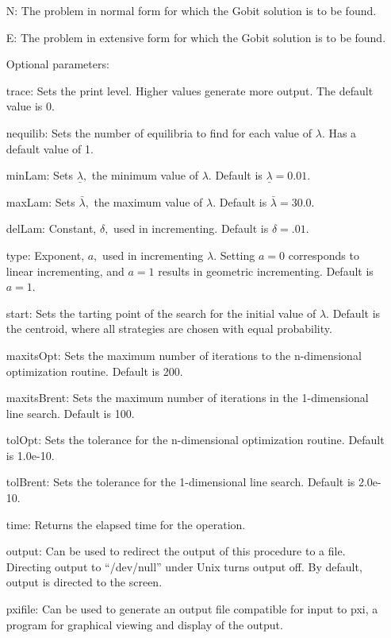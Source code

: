\begin{itemize}
\bd
\item
[N:] The problem in normal form for which the Gobit solution is to be
found.
\item	
[E:] The problem in extensive form for which the Gobit solution is to
be found.
\ed

\item
[Optional parameters:]\hfil\null

\bd
\item
[trace:] Sets the print level.  Higher values generate more output.
The default value is 0.
\item
[nequilib:] Sets the number of equilibria to find for each value of
$\lambda$.  Has a default value of 1.
\item
[minLam:] Sets $\underline\lambda,$ the minimum value of $\lambda.$
Default is $\underline\lambda = 0.01$.
\item
[maxLam:] Sets $\bar\lambda,$ the maximum value of $\lambda.$  Default is
$\bar\lambda = 30.0.$
\item
[delLam:]  Constant, $\delta,$ used in incrementing.   Default is
$\delta = .01.$
\item
[type:] Exponent, $a,$ used in incrementing $\lambda.$  Setting $a = 0$
corresponds to linear incrementing, and $a = 1$ results in geometric
incrementing.  Default is $a = 1$.
\item
[start:] Sets the tarting point of the search for the initial value of
$\lambda.$  Default is the centroid, where all strategies are chosen
with equal probability.  
\item
[maxitsOpt:] Sets the maximum number of iterations to the
n-dimensional optimization routine.  Default is 200.
\item
[maxitsBrent:] Sets the maximum number of iterations in the
1-dimensional line search.  Default is 100.
\item
[tolOpt:] Sets the tolerance for the n-dimensional optimization
routine.  Default is 1.0e-10.
\item
[tolBrent:] Sets the tolerance for the 1-dimensional line search.
Default is 2.0e-10.
\item
[time:] Returns the elapsed time for the operation.
\item
[output:] Can be used to redirect the output of this procedure to a
file.  Directing output to ``/dev/null'' under Unix turns output off.
By default, output is directed to the screen.
\item
[pxifile:] Can be used to generate an output file compatible for input
to pxi, a program for graphical viewing and display of the output.  
\ed
\ed


\end{itemize}
